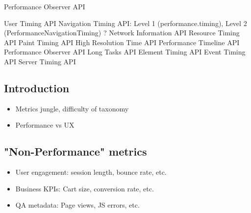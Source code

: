 Performance Observer API %




User Timing API
Navigation Timing API: Level 1 (performance.timing), Level 2 (PerformanceNavigationTiming) ?
Network Information API
Resource Timing API
Paint Timing API
High Resolution Time API
Performance Timeline API
Performance Observer API
Long Tasks API
Element Timing API
Event Timing API
Server Timing API
















\subsection{Introduction}

\begin{itemize}
\item Metrics jungle, difficulty of taxonomy
\item Performance vs UX
\end{itemize}










\subsection{"Non-Performance" metrics}

\begin{itemize}
\item User engagement: session length, bounce rate, etc.
\item Business KPIs: Cart size, conversion rate, etc.
\item QA metadata: Page views, JS errors, etc.
\end{itemize}



